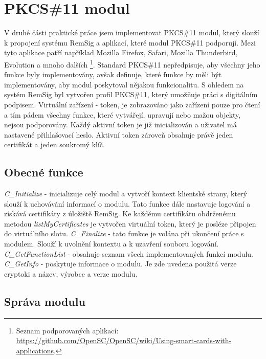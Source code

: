 \documentclass[]{fithesis3}
\begin{document}
	\section{PKCS\#11 modul}
	
	V druhé části praktické práce jsem implementovat PKCS\#11 modul, který slouží k propojení 		systému RemSig a aplikací, které modul PKCS\#11 podporují. Mezi tyto aplikace patří například 	Mozilla Firefox, Safari, Mozilla Thunderbird, Evolution a mnoho dalších
\footnote{Seznam podporovaných aplikací: \url{https://github.com/OpenSC/OpenSC/wiki/Using-smart-cards-with-applications}.}. 
	Standard PKCS\#11 nepředpisuje, aby všechny jeho funkce byly implementovány, avšak 			definuje, které funkce by měli být implementovány, aby modul poskytoval nějakou funkcionalitu. S ohledem 	na systém RemSig byl vytvořen profil PKCS\#11, který umožňuje práci s digitálním podpisem. 		Virtuální zařízení - token, je zobrazováno jako zařízení pouze pro čtení a tím pádem všechny 		funkce, které vytvářejí, upravují nebo mažou objekty, nejsou podporovány. Každý aktivní token je 	již inicializován a uživatel má nastavené přihlašovací heslo. Aktivní token zároveň obsahuje 			právě jeden certifikát a jeden soukromý klíč.

	\subsection{Obecné funkce} 
	\textit{C\_Initialize} - inicializuje celý modul a vytvoří kontext klientské strany, který slouží k 		uchovávání informací o modulu. Tato funkce dále nastavuje logování a získává certifikáty z 			úložiště RemSig. Ke každému certifikátu obdrženému metodou \textit{listMyCertificates} je 			vytvořen virtuální token, který je posléze připojen do virtuálního slotu. 
	\newline
 	\newline
	\textit{C\_Finalize} - tato funkce je volána při ukončení práce s modulem. Slouží k uvolnění 			kontextu a k uzavření souboru logování.
	\newline
	\newline
	\textit{C\_GetFunctionList} - obsahuje seznam všech implementovaných funkcí modulu.
	\newline
	\newline
	\textit{C\_GetInfo} - poskytuje informace o modulu. Je zde uvedena použitá verze 				cryptoki a název, výrobce a verze modulu.

	\subsection{Správa modulu} 
\end{document}
